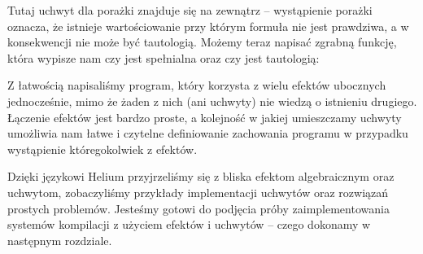 Tutaj uchwyt dla porażki znajduje się na zewnątrz -- wystąpienie porażki oznacza, że istnieje wartościowanie przy którym formuła nie jest prawdziwa, a w konsekwencji nie może być tautologią. Możemy teraz napisać zgrabną funkcję, która wypisze nam czy  jest spełnialna oraz czy jest tautologią:



Z łatwością napisaliśmy program, który korzysta z wielu efektów ubocznych jednocześnie, mimo że żaden z nich (ani uchwyty) nie wiedzą o istnieniu drugiego. Łączenie efektów jest bardzo proste, a kolejność w jakiej umieszczamy uchwyty umożliwia nam łatwe i czytelne definiowanie zachowania programu w przypadku wystąpienie któregokolwiek z efektów.

Dzięki językowi Helium przyjrzeliśmy się z bliska efektom algebraicznym oraz uchwytom, zobaczyliśmy przykłady implementacji uchwytów oraz rozwiązań prostych problemów. Jesteśmy gotowi do podjęcia próby zaimplementowania systemów kompilacji z użyciem efektów i uchwytów -- czego dokonamy w następnym rozdziale.

\undef\inl
